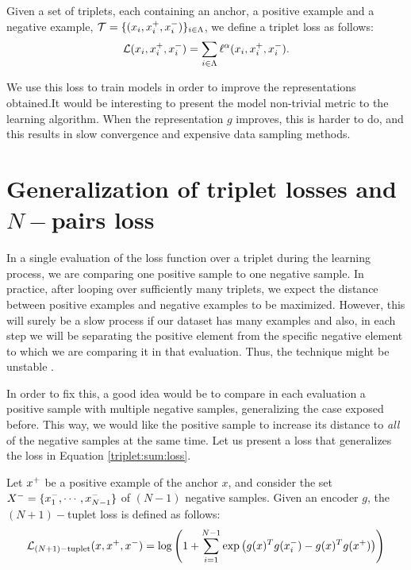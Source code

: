 \begin{ndef}
Given a set of triplets, each containing an anchor, a positive example and a negative example, $\mathcal T = \{(x_i,x^+_i,x^-_i)\}_{i \in \Lambda}$, we define a triplet loss as follows:
\begin{equation}\label{triplet:sum:loss}
\mathcal L (x_i,x^+_i,x^-_i) = \sum_{i \in \Lambda} \ell^\alpha(x_i,x^+_i,x^-_i).
\end{equation}

\end{ndef}



We use this loss to train models in order to improve the representations obtained.It would be interesting to present the model non-trivial metric to the learning algorithm. When the representation $g$ improves, this is harder to do, and this results in slow convergence and expensive data sampling methods.

\section{Generalization of triplet losses and $N-$pairs loss}

In a single evaluation of the loss function over a triplet during the learning process, we are comparing one positive sample to one negative sample. In practice, after looping over sufficiently many triplets, we expect the distance between positive examples and negative examples to be maximized. However, this will surely be a slow process if our dataset has many examples and also, in each step we will be separating the positive element from the specific negative element to which we are comparing it in that evaluation. Thus, the technique might be unstable \citep{Sohn2016ImprovedDM}.

In order to fix this, a good idea would be to compare in each evaluation a positive sample with multiple negative samples, generalizing the case exposed before. This way, we would like the positive sample to increase its distance to \emph{all} of the negative samples at the same time. Let us present a loss that generalizes the loss in Equation \eqref{triplet:sum:loss}.

\begin{ndef}
Let $x^+$ be a positive example of the anchor $x$, and consider the set $X^- = \{x^-_1,\cdots,x^-_{N-1}\}$ of $(N-1)$ negative samples. Given an encoder $g$, the $(N+1)-$tuplet loss is defined as follows:
\begin{equation}\label{nplus1:tuplet:loss}
\mathcal L_{(N+1)-\text{tuplet}}(x,x^+,x^-) = \log \left( 1+ \sum_{i=1}^{N-1} \exp \left(g(x)^T g(x^-_i) - g(x)^T g(x^+)\right)\right) 
\end{equation}
\end{ndef}


